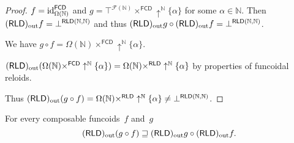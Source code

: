 \begin{proof}
$f=\operatorname{id}_{\Omega(\mathbb{N})}^{\mathsf{FCD}}$ and $g=\top^{\mathscr{F}(\mathbb{N})}\times^{\mathsf{FCD}}\uparrow^{\mathbb{N}}\{\alpha\}$
for some $\alpha\in\mathbb{N}$. Then $(\mathsf{RLD})_{\mathrm{out}} f=\bot^{\mathsf{RLD}(\mathbb{N},\mathbb{N})}$
and thus $(\mathsf{RLD})_{\mathrm{out}} g\circ(\mathsf{RLD})_{\mathrm{out}} f=\bot^{\mathsf{RLD}(\mathbb{N},\mathbb{N})}$.

We have $g\circ f=\Omega(\mathbb{N})\times^{\mathsf{FCD}}\uparrow^{\mathbb{N}}\{\alpha\}$.

$(\mathsf{RLD})_{\mathrm{out}}(\Omega(\mathbb{N})\times^{\mathsf{FCD}}\uparrow^{\mathbb{N}}\{\alpha\})=\Omega(\mathbb{N})\times^{\mathsf{RLD}}\uparrow^{\mathbb{N}}\{\alpha\}$
by properties of funcoidal reloids.




Thus $(\mathsf{RLD})_{\mathrm{out}}(g\circ f)=\Omega(\mathbb{N})\times^{\mathsf{RLD}}\uparrow^{\mathbb{N}}\{\alpha\}\ne\bot^{\mathsf{RLD}(\mathbb{N},\mathbb{N})}$.\end{proof}
\begin{conjecture}
For every composable funcoids~$f$ and~$g$
\[
(\mathsf{RLD})_{\mathrm{out}}(g\circ f)\sqsupseteq(\mathsf{RLD})_{\mathrm{out}} g\circ(\mathsf{RLD})_{\mathrm{out}} f.
\]
\end{conjecture}


